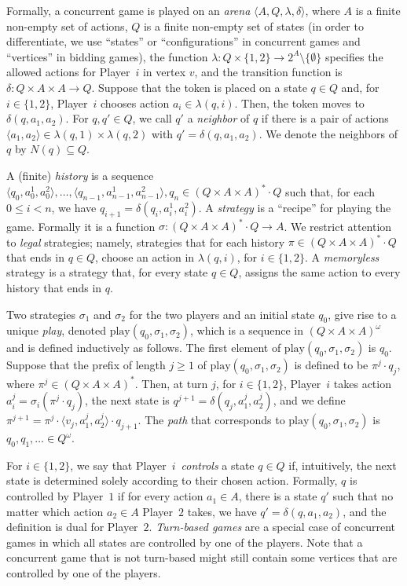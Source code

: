 \documentclass{article}\providecommand{\nequiv}{\not\equiv}\usepackage[a4paper,margin=20mm]{geometry}
\newcommand{\PO}{Player~$1$\xspace}
\newcommand{\PT}{Player~$2$\xspace}
\newcommand{\PLi}{Player~$i$\xspace}
\newcommand{\play}{\text{play}\xspace}
\newcommand{\zug}[1]{\langle #1  \rangle}
\renewcommand{\set}[1]{\{ #1  \}}
\begin{document}
Formally, a concurrent game is played on an {\em arena} $\zug{A, Q, \lambda, \delta}$, where $A$ is a finite non-empty set of actions, $Q$ is a finite non-empty set of states (in order to differentiate, we use ``states'' or ``configurations'' in concurrent games and ``vertices'' in bidding games), the function $\lambda: Q \times \set{1,2} \rightarrow 2^A \setminus \{\emptyset\}$ specifies the allowed actions for \PLi in vertex $v$, and the transition function is $\delta: Q \times A \times A \rightarrow Q$. Suppose that the token is placed on a state $q \in Q$ and, for $i \in \set{1,2}$, \PLi chooses action $a_i \in \lambda(q, i)$. Then, the token moves to $\delta(q, a_1, a_2)$. For $q,q' \in Q$, we call $q'$ a {\em neighbor} of $q$ if there is a pair of actions $\zug{a_1,a_2} \in \lambda(q, 1) \times \lambda(q, 2)$ with $q' = \delta(q, a_1, a_2)$. We denote the neighbors of $q$ by $N(q) \subseteq Q$.


A (finite) {\em history} is a sequence  $\zug{q_0,a^1_0, a^2_0},\ldots, \zug{q_{n-1},a^1_{n-1},a^2_{n-1}}, q_n \in (Q \times A \times A)^*\cdot Q$ such that, for each $0 \leq i <n$, we have $q_{i+1} = \delta(q_i, a^1_i, a^2_i)$. 
A {\em strategy} is a ``recipe'' for playing the game. Formally it is a function $\sigma: (Q \times A \times A)^*\cdot Q \rightarrow A$. We restrict attention to {\em legal} strategies; namely, strategies that for each history $\pi \in (Q \times A \times A)^*\cdot Q$ that ends in $q \in Q$, choose an action in $\lambda(q, i)$, for $i \in \set{1,2}$. A {\em memoryless} strategy is a strategy that, for every state $q \in Q$, assigns the same action to every history that ends in $q$. 

Two strategies $\sigma_1$ and $\sigma_2$ for the two players and an initial state $q_0$, give rise to a unique {\em play}, denoted $\play(q_0, \sigma_1, \sigma_2)$, which is a sequence in $(Q \times A \times A)^\omega$ and is defined inductively as follows. The first element of $\play(q_0, \sigma_1, \sigma_2)$ is $q_0$. Suppose that the prefix of length $j \geq 1$ of \(\play(q_0, \sigma_1, \sigma_2)\) is defined to be $\pi^j \cdot q_j$, where $\pi^j \in (Q \times A \times A)^*$. Then, at turn $j$, for $i \in \set{1,2}$, \PLi takes action $a^j_i = \sigma_i(\pi^j \cdot q_j)$, the next state is $q^{j+1} = \delta(q_j, a^j_1, a^j_2)$, and we define $\pi^{j+1} = \pi^j \cdot \zug{v_j, a^j_1, a^j_2} \cdot q_{j+1}$. The {\em path} that corresponds to $\play(q_0, \sigma_1, \sigma_2)$ is $q_0,q_1,\ldots \in Q^\omega$. 

For $i \in \set{1,2}$, we say that \PLi ~{\em controls} a state $q \in Q$ if, intuitively, the next state is determined solely according to their chosen action. Formally, $q$ is controlled by \PO if for every action $a_1 \in A$, there is a state $q'$ such that no matter which action $a_2 \in A$ \PT takes, we have $q' = \delta(q, a_1, a_2)$, and the definition is dual for \PT. {\em Turn-based games} are a special case of concurrent games in which all states are controlled by one of the players.  Note that a concurrent game that is not turn-based might still contain some vertices that are controlled by one of the players. 
\end{document}
